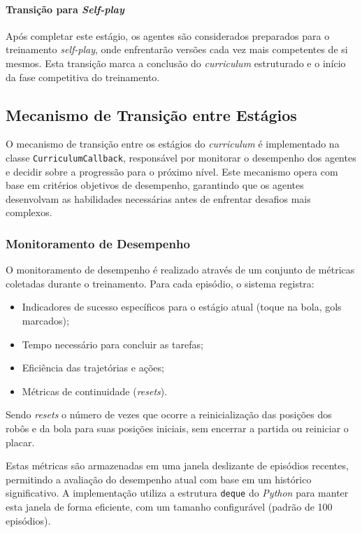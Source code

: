 \paragraph{Transição para \textit{Self-play}}

Após completar este estágio, os agentes são considerados preparados para o treinamento \textit{self-play}, onde enfrentarão versões cada vez mais competentes de si mesmos. Esta transição marca a conclusão do \textit{curriculum} estruturado e o início da fase competitiva do treinamento.

\subsection{Mecanismo de Transição entre Estágios}
\label{subsec:mecanismo_transicao}

O mecanismo de transição entre os estágios do \textit{curriculum} é implementado na classe \texttt{CurriculumCallback}, responsável por monitorar o desempenho dos agentes e decidir sobre a progressão para o próximo nível. Este mecanismo opera com base em critérios objetivos de desempenho, garantindo que os agentes desenvolvam as habilidades necessárias antes de enfrentar desafios mais complexos.

\subsubsection{Monitoramento de Desempenho}

O monitoramento de desempenho é realizado através de um conjunto de métricas coletadas durante o treinamento. Para cada episódio, o sistema registra:

\begin{itemize}
    \item Indicadores de sucesso específicos para o estágio atual (toque na bola, gols marcados);
    \item Tempo necessário para concluir as tarefas;
    \item Eficiência das trajetórias e ações;
    \item Métricas de continuidade (\textit{resets}).
\end{itemize}

Sendo \textit{resets} o número de vezes que ocorre a reinicialização das posições dos robôs e da bola para suas posições iniciais, sem encerrar a partida ou reiniciar o placar.

Estas métricas são armazenadas em uma janela deslizante de episódios recentes, permitindo a avaliação do desempenho atual com base em um histórico significativo. A implementação utiliza a estrutura \texttt{deque} do \textit{Python} para manter esta janela de forma eficiente, com um tamanho configurável (padrão de 100 episódios).

